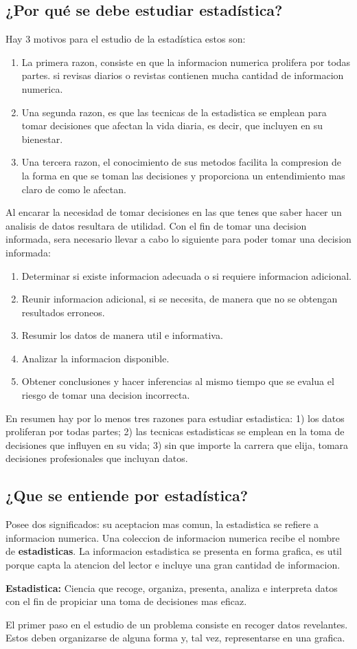 \documentclass[]{article}
\begin{document}
\subsection{¿Por qué se debe estudiar estadística?}
Hay 3 motivos para el estudio de la estadística estos son:
\begin{enumerate}
	\item La primera razon, consiste en que la informacion numerica prolifera por todas partes. si revisas diarios o revistas contienen mucha cantidad de informacion numerica.
	\item Una segunda razon, es que las tecnicas de la estadistica se emplean para tomar decisiones que afectan la vida diaria, es decir, que incluyen en su bienestar.
	\item Una tercera razon, el conocimiento de sus metodos facilita la compresion de la forma en que se toman las decisiones y proporciona un entendimiento mas claro de como le afectan. 
\end{enumerate}
Al encarar la necesidad de tomar decisiones en las que tenes que saber hacer un analisis de datos resultara de utilidad. Con el fin de tomar una decision informada, sera necesario llevar a cabo lo siguiente para poder tomar una decision informada:
\begin{enumerate}
	\item Determinar si existe informacion adecuada o si requiere informacion adicional.
	\item Reunir informacion adicional, si se necesita, de manera que no se obtengan resultados erroneos.
	\item Resumir los datos de manera util e informativa.
	\item Analizar la informacion disponible.
	\item Obtener conclusiones y hacer inferencias al mismo tiempo que se evalua el riesgo de tomar una decision incorrecta.
\end{enumerate}
En resumen hay por lo menos tres razones para estudiar estadistica: 1) los datos proliferan por todas partes; 2) las tecnicas estadisticas se emplean en la toma de decisiones que influyen en su vida; 3) sin que importe la carrera que elija, tomara decisiones profesionales que incluyan datos.

\subsection{¿Que se entiende por estadística?}
Posee dos significados: su aceptacion mas comun, la estadistica se refiere a informacion numerica. Una coleccion de informacion numerica recibe el nombre de \textbf{estadisticas}. La informacion estadistica se presenta en forma grafica, es util porque capta la atencion del lector e incluye una gran cantidad de informacion. 
\begin{flushleft}
\textbf{Estadistica:} Ciencia que recoge, organiza, presenta, analiza e interpreta datos con el fin de propiciar una toma de decisiones mas eficaz.
\end{flushleft}
El primer paso en el estudio de un problema consiste en recoger datos revelantes. Estos deben organizarse de alguna forma y, tal vez, representarse en una grafica.
\end{document}
